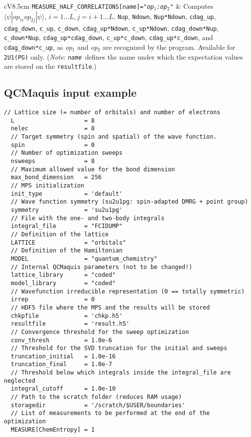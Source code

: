 \documentclass[bibliography=totoc,12pt,a4paper]{scrartcl}
\newcommand{\qcm}{\textsc{QCMaquis}}
\begin{document}
\begin{table}
\begin{tabular}{cV{8.5cm}}
	\texttt{MEASURE\_HALF}\texttt{\_CORRELATIONS[\textit{name}]="\textit{op$_1$:op$_2$}"}
			& Computes $\langle \psi | op_{1i} op_{2j}| \psi \rangle, \, i = 1 \ldots L, j=i+1 \ldots L$. \texttt{Nup}, \texttt{Ndown}, \texttt{Nup*Ndown}, \texttt{cdag\_up}, \texttt{cdag\_down}, \texttt{c\_up}, \texttt{c\_down}, \texttt{cdag\_up*Ndown}, \texttt{c\_up*Ndown}, \texttt{cdag\_down*Nup}, \texttt{c\_down*Nup}, \texttt{cdag\_up*cdag\_down}, \texttt{c\_up*c\_down}, \texttt{cdag\_up*c\_down}, and \texttt{cdag\_down*c\_up}, as \textit{op$_1$} and \textit{op$_2$} are recognized by the program. Available for \texttt{2U1(PG)} only. (\emph{Note}: \texttt{\textit{name}}\ defines the name under which the expectation values are stored on the \texttt{resultfile}.) \\
	\bottomrule
  \end{tabular}
\end{table}

\clearpage

\subsection{QCMaquis input example}
\label{sec:input-qcm}

\begin{lstlisting}[language=qcmaquis,
				   caption={Input example for a DMRG-CASCI(8,8) standalone \qcm{} calculation},
				   label=lst:qcm]
  // Lattice size (= number of orbitals) and number of electrons
  L                    = 8
  nelec                = 8
  // Target symmetry (spin and spatial) of the wave function.
  spin                 = 0
  // Number of optimization sweeps
  nsweeps              = 8
  // Maximum allowed value for the bond dimension
  max_bond_dimension   = 256
  // MPS initialization
  init_type            = 'default'
  // Wave function symmetry (su2u1pg: spin-adapted DMRG + point group)
  symmetry             = 'su2u1pg'
  // File with the one- and two-body integrals
  integral_file        = "FCIDUMP"
  // Definition of the lattice
  LATTICE              = "orbitals"
  // Definition of the Hamiltonian
  MODEL                = "quantum_chemistry"
  // Internal QCMaquis parameters (not to be changed!)
  lattice_library      = "coded"
  model_library        = "coded"
  // Wavefunction irreducible representation (0 == totally symmetric)
  irrep                = 0
  // HDF5 file where the MPS and the results will be stored
  chkpfile             = 'chkp.h5'
  resultfile           = 'result.h5'
  // Convergence threshold for the sweep optimization
  conv_thresh          = 1.0e-6
  // Threshold for the SVD truncation for the initial and sweeps
  truncation_initial   = 1.0e-16
  truncation_final     = 1.0e-7
  // Threshold below which integrals inside the integral_file are neglected
  integral_cutoff      = 1.0e-10
  // Path to the scratch folder (reduces RAM usage)
  storagedir           = '/scratch/$USER/boundaries'
  // List of measurements to be performed at the end of the optimization
  MEASURE[ChemEntropy] = 1
\end{lstlisting}
\end{document}
